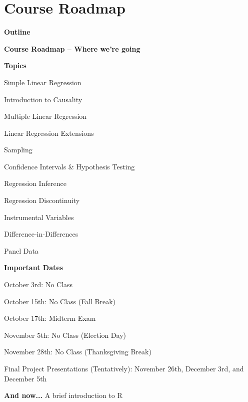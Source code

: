\documentclass[11pt, aspectratio=169]{beamer}
\newenvironment{wideitemize}{\itemize\addtolength{\itemsep}{5pt}}{\enditemize}
\newenvironment{wideenumerate}{\enumerate\addtolength{\itemsep}{5pt}}{\endenumerate}
\begin{document}
\section{Course Roadmap}
	\begin{frame}{\bf \large Outline}
	\tableofcontents[currentsection]
\end{frame}
\begin{frame}{\bf \large Course Roadmap -- Where we're going}

\begin{minipage}{.5\textwidth}
\begin{wideitemize}
	\item \textbf{Topics}
	\begin{wideenumerate}
		\item Simple Linear Regression 
		\item Introduction to Causality
		\item Multiple Linear Regression
		\item Linear Regression Extensions
		\item Sampling
		\item Confidence Intervals \& Hypothesis Testing
		\item Regression Inference
		\item Regression Discontinuity
		\item Instrumental Variables
		\item Difference-in-Differences
		\item Panel Data
	\end{wideenumerate}
\end{wideitemize}
\end{minipage}\pause%
\begin{minipage}{.5\textwidth}
	\begin{wideitemize}
		\item \textbf{Important Dates}
		\begin{wideitemize}
			\item	October 3rd: No Class
			\item	October 15th: No Class (Fall Break)
			\item	October 17th: Midterm Exam
			\item	November 5th: No Class (Election Day)
			\item	November 28th: No Class (Thanksgiving Break)
			\item	Final Project Presentations (Tentatively): November 26th, December 3rd, and December 5th 
		\end{wideitemize}
	\end{wideitemize}
\end{minipage}
\end{frame}

\begin{frame}{\bf \large And now...}
 \LARGE	A brief introduction to R
\end{frame}
\end{document}
